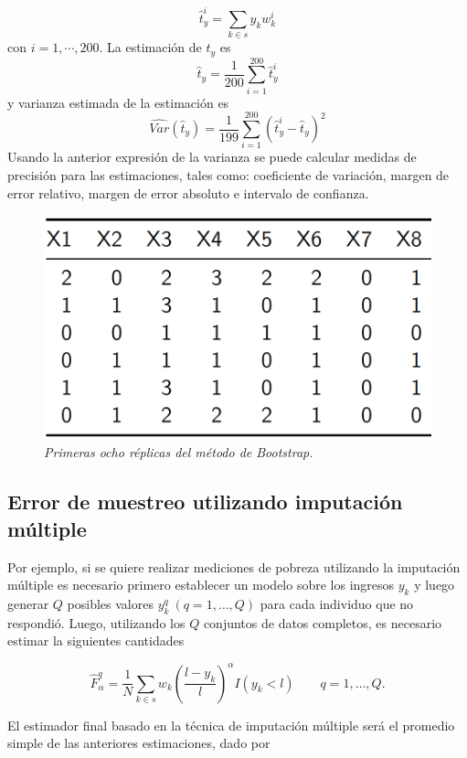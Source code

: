 \documentclass[12pt,spanish,]{book}
\begin{document}
\[\hat{t}_y^i=\sum_{k\in s} y_kw_k^i\]
con \(i=1,\cdots,200\). La estimación de \(t_y\) es
\[\hat{t}_y=\frac{1}{200}\sum_{i=1}^{200}\hat{t}_y^i\]
y varianza estimada de la estimación es
\[\hat{Var}(\hat{t}_y)=\frac{1}{199}\sum_{i=1}^{200}(\hat{t}_y^i-\hat{t}_y)^2\]
Usando la anterior expresión de la varianza se puede calcular medidas de precisión para las estimaciones, tales como: coeficiente de variación, margen de error relativo, margen de error absoluto e intervalo de confianza.

\begin{figure}
\centering
\includegraphics{Pics/23.png}
\caption{\emph{Primeras ocho réplicas del método de Bootstrap.}}
\end{figure}

\hypertarget{error-de-muestreo-utilizando-imputacion-multiple}{%
\subsection*{Error de muestreo utilizando imputación múltiple}\label{error-de-muestreo-utilizando-imputacion-multiple}}

Por ejemplo, si se quiere realizar mediciones de pobreza utilizando la imputación múltiple es necesario primero establecer un modelo sobre los ingresos \(y_k\) y luego generar \(Q\) posibles valores \(y_k^q \ (q=1, \ldots, Q)\) para cada individuo que no respondió. Luego, utilizando los \(Q\) conjuntos de datos completos, es necesario estimar la siguientes cantidades

\[
\hat{F}_{\alpha}^{q}=\frac{1}{N}\sum_{k\in s} w_k 
\left(\frac{l-y_k}{l}\right)^{\alpha}I(y_k<l) \ \ \ \ \ \ \ \ \ 
q= 1,\ldots, Q.
\]

El estimador final basado en la técnica de imputación múltiple será el promedio simple de las anteriores estimaciones, dado por
\end{document}
